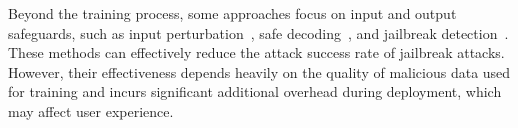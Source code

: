 Beyond the training process, some approaches focus on input and output safeguards, such as input perturbation~\citep{paraphrase}, safe decoding~\citep{SafeDecoding}, and jailbreak detection~\citep{SmoothLLM, SelfDefense, DBLP:journals/corr/abs-2309-00614, gao2024embedding}. These methods can effectively reduce the attack success rate of jailbreak attacks. 
However, their effectiveness depends heavily on the quality of malicious data used for training and incurs significant additional overhead during deployment, which may affect user experience.

